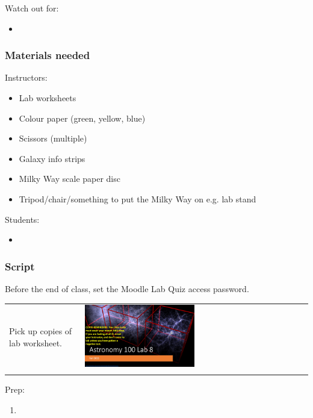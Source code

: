 \documentclass[12pt]{article}
\begin{document}
\noindent
Watch out for:
\begin{itemize}
\item 
\end{itemize}


\subsubsection{Materials needed}

Instructors:
\begin{itemize}
\item Lab worksheets
\item Colour paper (green, yellow, blue)
\item Scissors (multiple)
\item Galaxy info strips
\item Milky Way scale paper disc
\item Tripod/chair/something to put the Milky Way on e.g. lab stand
\end{itemize}

\noindent
Students:
\begin{itemize}
\item 
\end{itemize}


\subsubsection{Script}

Before the end of class, set the Moodle Lab Quiz access password.

\begin{longtable}{m{}m{}}
Pick up copies of lab worksheet. & \includegraphics[width=0.5\textwidth]{ppt/lab11/Slide1.jpeg}\\

\label{default}
\end{longtable}

Prep:
\begin{enumerate}
\item
\end{enumerate}
\end{document}
